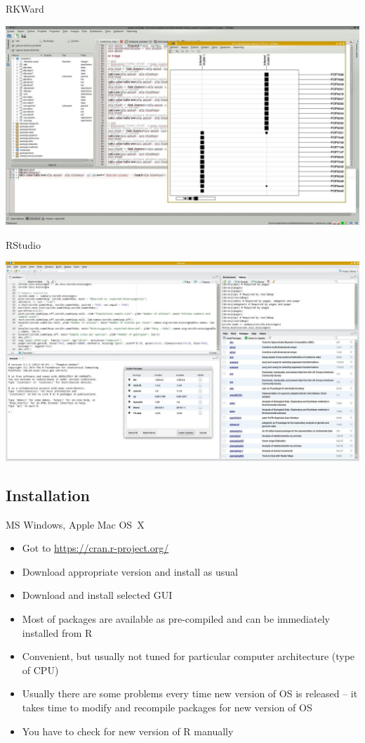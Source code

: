 \documentclass[compress, ucs, xelatex, 11pt, xcolor=svgnames,
  hyperref={
    bookmarks=true,
    unicode=true,
    colorlinks=true,
    pdftitle={Molecular data in R},
    plainpages=false,
    pdfauthor={Vojtech Zeisek},
    pdfsubject={Course about phylogeny and evolution in R},
    pdfcreator={XeLaTeX},
    pdfkeywords={R, evolution, phylogeny, molecular data},
    linkcolor=Tomato,
    anchorcolor=SaddleBrown,
    citecolor=Goldenrod,
    filecolor=DarkMagenta,
    menucolor=Sienna,
    urlcolor=DarkTurquoise,
    pdftex},
  url={hyphens, lowtilde} %
  ]{beamer}
\begin{document}
\begin{frame}{RKWard}
\begin{center}
  \includegraphics[width=\textwidth]{rkward.jpg}
\end{center}
\end{frame}

\begin{frame}{RStudio}
\begin{center}
  \includegraphics[width=\textwidth]{rstudio.jpg}
\end{center}
\end{frame}

\subsection{Installation}

\begin{frame}{MS Windows, Apple Mac OS~X}
\begin{itemize}
 \item Got to \url{https://cran.r-project.org/}
 \item Download appropriate version and install as usual
 \item Download and install selected GUI
 \item Most of packages are available as pre-compiled and can be immediately installed from R
 \item Convenient, but usually not tuned for particular computer architecture (type of CPU)
 \item Usually there are some problems every time new version of OS is released -- it takes time to modify and recompile packages for new version of OS
 \item You have to check for new version of R manually
\end{itemize}
\end{frame}
\end{document}
